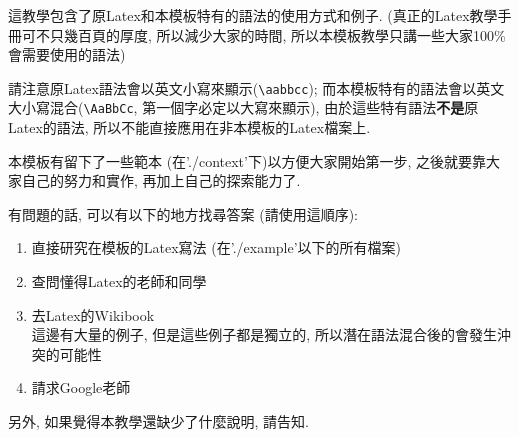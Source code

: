 
%

這教學包含了原Latex和本模板特有的語法的使用方式和例子. (真正的Latex教學手冊可不只幾百頁的厚度, 所以減少大家的時間, 所以本模板教學只講一些大家100\%會需要使用的語法)

請注意原Latex語法會以英文小寫來顯示(\verb|\aabbcc|); 而本模板特有的語法會以英文大小寫混合(\verb|\AaBbCc|, 第一個字必定以大寫來顯示), 由於這些特有語法\textbf{不是}原Latex的語法, 所以不能直接應用在非本模板的Latex檔案上.

本模板有留下了一些範本 (在'./context'下)以方便大家開始第一步, 之後就要靠大家自己的努力和實作, 再加上自己的探索能力了.

有問題的話, 可以有以下的地方找尋答案 (請使用這順序):
\begin{enumerate}
  \item 直接研究在模板的Latex寫法 (在'./example'以下的所有檔案)
  \item 查問懂得Latex的老師和同學 %
  \item 去Latex的Wikibook\\
        這邊有大量的例子, 但是這些例子都是獨立的, 所以潛在語法混合後的會發生沖突的可能性
  \item 請求Google老師 %
\end{enumerate}

另外, 如果覺得本教學還缺少了什麼說明, 請告知.

